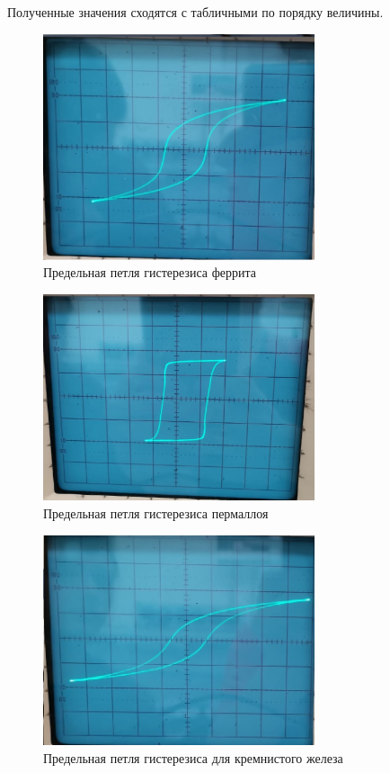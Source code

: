\documentclass[a4paper, 12pt]{article}
\begin{document}
\begin{enumerate}
Полученные значения сходятся с табличными по порядку величины.
\begin{figure}[h!]
    \centering
    \includegraphics[width=8cm]{ferrit.jpg}
    \caption{Предельная петля гистерезиса феррита}
\end{figure}
\begin{figure}[h!]
    \centering
    \includegraphics[width=8cm]{permalloi.jpg}
    \caption{Предельная петля гистерезиса пермаллоя}
\end{figure}
\newpage
\begin{figure}[h!]
    \centering
    \includegraphics[width=8cm]{Si_Fe.jpg}
    \caption{Предельная петля гистерезиса для кремнистого железа}
\end{figure}


\end{enumerate}
\end{document}
